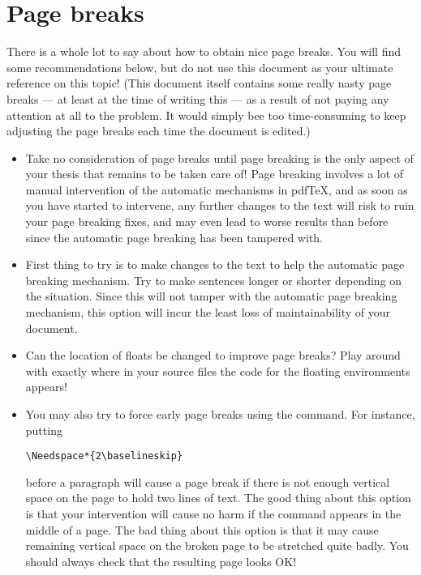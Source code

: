 \section{Page breaks}\label{sec:tipt:page-breaking}
%
There is a whole lot to say about how to obtain nice page breaks.  You will find some recommendations below, but do not use this document as your ultimate reference on this topic!  (This document itself contains some really nasty page breaks --- at least at the time of writing this --- as a result of not paying any attention at all to the problem.  It would simply bee too time-consuming to keep adjusting the page breaks each time the document is edited.)
\begin{itemize}
\item
  Take no consideration of page breaks until page breaking is the only aspect of your thesis that remains to be taken care of!  Page breaking involves a lot of manual intervention of the automatic mechanisms in pdf\TeX{}, and as soon as you have started to intervene, any further changes to the text will risk to ruin your page breaking fixes, and may even lead to worse results than before since the automatic page breaking has been tampered with.
\item
  First thing to try is to make changes to the text to help the automatic page breaking mechanism.  Try to make sentences longer or shorter depending on the situation.  Since this will not tamper with the automatic page breaking mechanism, this option will incur the least loss of maintainability of your document.
\item
  Can the location of floats be changed to improve page breaks?  Play around with exactly where in your source files the code for the floating environments appears!
\item
  You may also try to force early page breaks using the  command.  For instance, putting
{\verbatimsize
\begin{verbatim}
\Needspace*{2\baselineskip}
\end{verbatim}}
before a paragraph will cause a page break if there is not enough vertical space on the page to hold two lines of text.  The good thing about this option is that your intervention will cause no harm if the  command appears in the middle of a page.  The bad thing about this option is that it may cause remaining vertical space on the broken page to be stretched quite badly.  You should always check that the resulting page looks OK!


\end{itemize}
